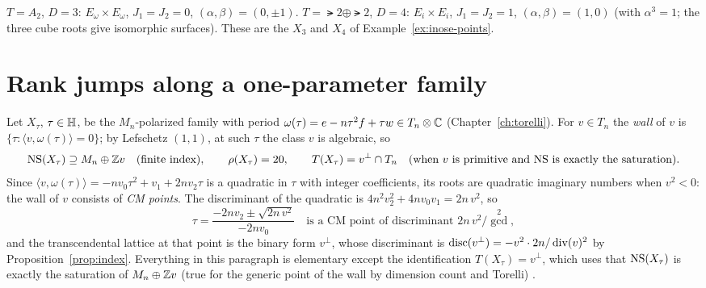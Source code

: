 \begin{example}
$T=A_2$, $D=3$: $E_\omega\times E_\omega$, $J_1=J_2=0$, $(\alpha,\beta)=(0,\pm1)$.
$T=\lat2\oplus\lat2$, $D=4$: $E_i\times E_i$, $J_1=J_2=1$, $(\alpha,\beta)=(1,0)$
(with $\alpha^3=1$; the three cube roots give isomorphic surfaces). These are
the $X_3$ and $X_4$ of Example~\ref{ex:inose-points}.
\end{example}

\section{Rank jumps along a one-parameter family}

Let $X_\tau$, $\tau\in\mathbb{H}$, be the $M_n$-polarized family with period
$\omega(\tau)=e-n\tau^2f+\tau w\in T_n\otimes\mathbb{C}$ (Chapter~\ref{ch:torelli}).
For $v\in T_n$ the \emph{wall} of $v$ is $\{\tau:\langle v,\omega(\tau)\rangle=0\}$;
by Lefschetz $(1,1)$, at such $\tau$ the class $v$ is algebraic, so
\[
  \operatorname{NS}(X_\tau)\supseteq M_n\oplus\mathbb{Z} v\quad\text{(finite index)},\qquad
  \rho(X_\tau)=20,\qquad
  T(X_\tau)=v^{\perp}\cap T_n \quad\text{(when $v$ is primitive and $\operatorname{NS}$ is exactly the saturation)}.
\]
Since $\langle v,\omega(\tau)\rangle=-nv_0\tau^2+v_1+2nv_2\tau$ is a quadratic
in $\tau$ with integer coefficients, its roots are quadratic imaginary
numbers when $v^2<0$: the wall of $v$ consists of \emph{CM points}. The
discriminant of the quadratic is $4n^2v_2^2+4nv_0v_1=2n\,v^2$, so
\[
  \tau=\frac{-2nv_2\pm\sqrt{2n\,v^2}}{-2nv_0}
  \quad\text{is a CM point of discriminant $2n\,v^2/\gcd^2$},
\]
and the transcendental lattice at that point is the binary form $v^{\perp}$,
whose discriminant is $\operatorname{disc}(v^{\perp})=-v^2\cdot 2n/\operatorname{div}(v)^2$ by
Proposition~\ref{prop:index}. Everything in this paragraph is elementary
except the identification $T(X_\tau)=v^{\perp}$, which uses that $\operatorname{NS}(X_\tau)$
is exactly the saturation of $M_n\oplus\mathbb{Z} v$ (true for the generic point of
the wall by dimension count and Torelli) \Lstatus.

